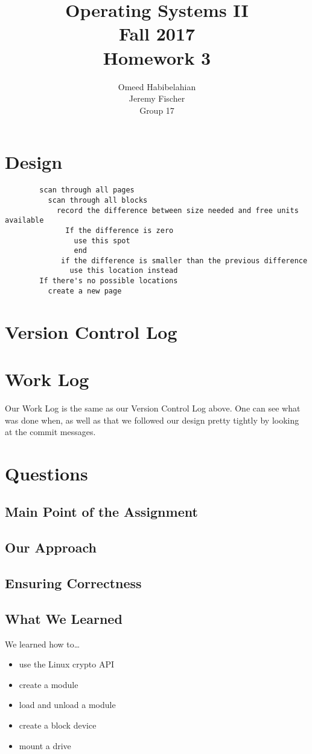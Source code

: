 \documentclass[draftclsnofoot, onecolumn, 10pt, compsoc]{IEEEtran}
\title{\textbf{Operating Systems II}\\Fall 2017\\Homework 3}
\author{Omeed Habibelahian\\Jeremy Fischer\\Group 17}
\begin{document}
	\maketitle
	\newpage
	
	\section{Design}
		\begin{lstlisting}
		scan through all pages
		  scan through all blocks
		    record the difference between size needed and free units available
			  If the difference is zero
			    use this spot
			    end
			 if the difference is smaller than the previous difference
			   use this location instead
		If there's no possible locations
		  create a new page
		\end{lstlisting}
		
	
	\section{Version Control Log}

	\section{Work Log}
		Our Work Log is the same as our Version Control Log above.
		One can see what was done when, as well as that we followed our design pretty tightly by looking at the commit messages.
		
	\section{Questions}
		\subsection{Main Point of the Assignment}

		\subsection{Our Approach}

		\subsection{Ensuring Correctness}

		\subsection{What We Learned}
			We learned how to\dots 
			\begin{itemize}
				\item use the Linux crypto API
				
				\item create a module
				
				\item load and unload a module
				
				\item create a block device
				
				\item mount a drive
			\end{itemize}
\end{document}
